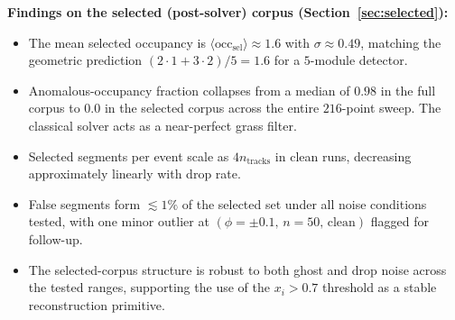 \documentclass[11pt,a4paper]{article}
\begin{document}
\noindent\textbf{Findings on the selected (post-solver) corpus
(Section~\ref{sec:selected}):}
\begin{itemize}
  \item The mean selected occupancy is $\langle\mathrm{occ}_{\mathrm{sel}}
        \rangle \approx 1.6$ with $\sigma \approx 0.49$, matching the
        geometric prediction $(2{\cdot}1 + 3{\cdot}2)/5 = 1.6$ for a
        $5$-module detector.
  \item Anomalous-occupancy fraction collapses from a median of $0.98$ in
        the full corpus to $0.0$ in the selected corpus across the
        entire $216$-point sweep.  The classical solver acts as a
        near-perfect grass filter.
  \item Selected segments per event scale as $4 n_\mathrm{tracks}$ in
        clean runs, decreasing approximately linearly with drop rate.
  \item False segments form $\lesssim 1\%$ of the selected set under all
        noise conditions tested, with one minor outlier at
        $(\phi = \pm 0.1,\, n=50,\, \text{clean})$ flagged for follow-up.
  \item The selected-corpus structure is robust to both ghost and drop
        noise across the tested ranges, supporting the use of the
        $x_i > 0.7$ threshold as a stable reconstruction primitive.
\end{itemize}
\end{document}
